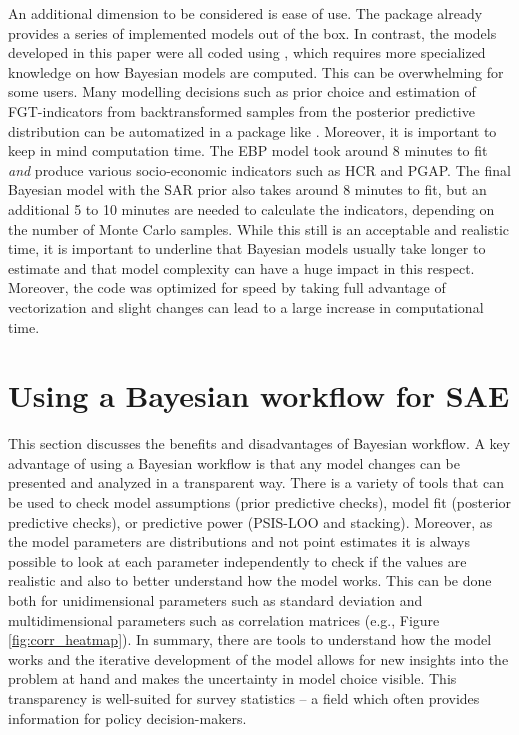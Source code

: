 An additional dimension to be considered is ease of use.
The  package already provides a series of implemented models out of the box.
In contrast, the models developed in this paper were all coded using , which requires more specialized knowledge on how Bayesian models are computed.
This can be overwhelming for some users.
Many modelling decisions such as prior choice and estimation of FGT-indicators from backtransformed samples from the posterior predictive distribution can be automatized in a package like .
Moreover, it is important to keep in mind computation time.
The EBP model took around 8 minutes to fit \textit{and} produce various socio-economic indicators such as HCR and PGAP.
The final Bayesian model with the SAR prior also takes around 8 minutes to fit, but an additional 5 to 10 minutes are needed to calculate the indicators, depending on the number of Monte Carlo samples.
While this still is an acceptable and realistic time, it is important to underline that Bayesian models usually take longer to estimate and that model complexity can have a huge impact in this respect.
Moreover, the  code was optimized for speed by taking full advantage of vectorization and slight changes can lead to a large increase in computational time.

\section{Using a Bayesian workflow for SAE}

This section discusses the benefits and disadvantages of Bayesian workflow.
A key advantage of using a Bayesian workflow is that any model changes can be presented and analyzed in a transparent way.
There is a variety of tools that can be used to check model assumptions (prior predictive checks), model fit (posterior predictive checks), or predictive power (PSIS-LOO and stacking).
Moreover, as the model parameters are distributions and not point estimates it is always possible to look at each parameter independently to check if the values are realistic and also to better understand how the model works.
This can be done both for unidimensional parameters such as standard deviation and multidimensional parameters such as correlation matrices (e.g., Figure \ref{fig:corr_heatmap}).
In summary, there are tools to understand how the model works and the iterative development of the model allows for new insights into the problem at hand and makes the uncertainty in model choice visible.
This transparency is well-suited for survey statistics – a field which often provides information for policy decision-makers.

